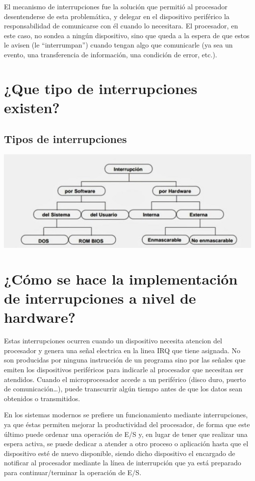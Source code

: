 \documentclass{article}
\begin{document}
\vspace{5mm}
\par
El mecanismo de interrupciones fue la solución que permitió al procesador desentenderse de esta problemática, y delegar en el dispositivo periférico la responsabilidad de comunicarse con él cuando lo necesitara. El procesador, en este caso, no sondea a ningún dispositivo, sino que queda a la espera de que estos le avisen (le “interrumpan”) cuando tengan algo que comunicarle (ya sea un evento, una transferencia de información, una condición de error, etc.).


\section{¿Que tipo de interrupciones existen?}
\subsection{Tipos de interrupciones}
\vspace{4mm}
\includegraphics{interrupciones.jpg}
\vspace{5mm}

\section{¿Cómo se hace la implementación de interrupciones a nivel de hardware?}

\par
Estas interrupciones ocurren cuando un dispositivo necesita atencion del procesador y genera una señal electrica en la linea IRQ que tiene asignada. No son producidas por ninguna instrucción de un programa sino por las señales que emiten los dispositivos periféricos para indicarle al procesador que necesitan ser atendidos. Cuando el microprocesador accede a un periférico (disco duro, puerto de comunicación…), puede transcurrir algún tiempo antes de que los datos sean obtenidos o transmitidos. 

En los sistemas modernos se prefiere un funcionamiento mediante interrupciones, ya que éstas permiten mejorar la productividad del procesador, de forma que este último puede ordenar una operación de E/S y, en lugar de tener que realizar una espera activa, se puede dedicar a atender a otro proceso o aplicación hasta que el dispositivo esté de nuevo disponible, siendo dicho dispositivo el encargado de notificar al procesador mediante la línea de interrupción que ya está preparado para continuar/terminar la operación de E/S.
\end{document}
